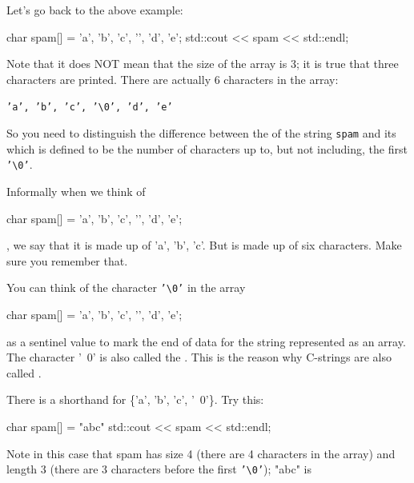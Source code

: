 Let's go back to the above example:

\begin{consolethree}[escapeinside=||]
char spam[] = {'a', 'b', 'c', '\0', 'd', 'e'};
std::cout << spam << std::endl;
\end{consolethree}

Note that it does NOT mean that the size of the array is 3; it is true that three characters are printed. There are actually 6 characters in the array:

\begin{center}
\texttt{'a', 'b', 'c', \texttt{'\textbackslash 0'}, 'd', 'e'}
\end{center}

So you need to distinguish the difference between the  of the string \texttt{spam} and its  which is defined to be the number of characters up to, but not including, the first \texttt{'\textbackslash 0'}.

Informally when we think of

\begin{consolethree}[escapeinside=||]
char spam[] = {'a', 'b', 'c', '\0', 'd', 'e'};
\end{consolethree}

, we say that it is made up of 'a', 'b', 'c'. But  is made up of six characters. Make sure you remember that.

You can think of the character \texttt{'\textbackslash 0'} in the array

\begin{consolethree}[escapeinside=||]
char spam[] = {'a', 'b', 'c', '\0', 'd', 'e'};
\end{consolethree}

as a sentinel value to mark the end of data for the string represented as an array. The character '\ 0' is also called the . This is the reason why C-strings are also called .


There is a shorthand for \{'a', 'b', 'c', '\ 0'\}. Try this:

\begin{consolethree}[escapeinside=||]
char spam[] = "abc"
std::cout << spam << std::endl;
\end{consolethree}

Note in this case that spam has size 4 (there are 4 characters in the array) and length 3 (there are 3 characters before the first \texttt{'\textbackslash 0'}); "abc" is

